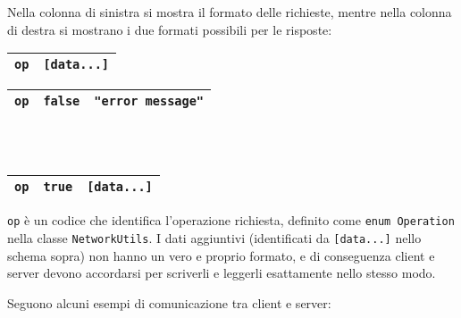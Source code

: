 \documentclass[a4paper,11pt] {article}
\begin{document}
Nella colonna di sinistra si mostra il formato delle richieste, mentre nella colonna di destra si mostrano i due formati possibili per le risposte:

\begin{multicols}{2}
	\begin{table}[H]
		\center
		\begin{tabular}{|l|l|}
			\hline
			\texttt{op} & \texttt{[data...]} \\ \hline
		\end{tabular}
	\end{table}

	\columnbreak

	\begin{table}[H]
		\center
		\begin{tabular}{|l|l|l|}
			\hline
			\texttt{op} & \texttt{false} & \texttt{"error message"} \\ \hline
		\end{tabular}
		\\~\\
		\begin{tabular}{|l|l|l|}
			\hline
			\texttt{op} & \texttt{true} & \texttt{[data...]} \\ \hline
		\end{tabular}
	\end{table}
\end{multicols}

\texttt{op} è un codice che identifica l'operazione richiesta, definito come \texttt{enum Operation} nella classe \texttt{NetworkUtils}.
I dati aggiuntivi (identificati da \texttt{[data...]} nello schema sopra) non hanno un vero e proprio formato, e di conseguenza client e server devono accordarsi per scriverli e leggerli esattamente nello stesso modo.

Seguono alcuni esempi di comunicazione tra client e server:
\end{document}
